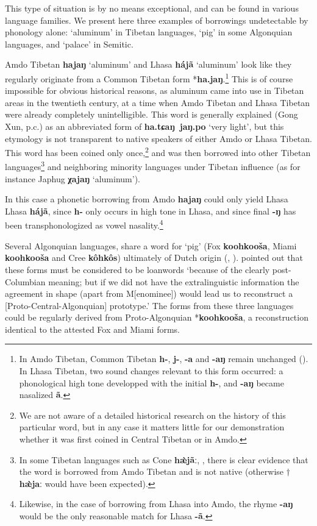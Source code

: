 \documentclass[oneside,a4paper,11pt]{article}
\newcommand{\ipa}[1]{\textbf{{\phon\mbox{#1}}}} %
\begin{document}
This type of situation is by no means exceptional, and can be found in various language families. We present here three examples of borrowings undetectable by phonology alone: `aluminum' in Tibetan languages, `pig' in some Algonquian languages, and `palace' in Semitic. 

Amdo Tibetan \ipa{hajaŋ} `aluminum' and Lhasa \ipa{hájã} `aluminum' look like they regularly originate from a Common Tibetan form *\ipa{ha.jaŋ}.\footnote{In Amdo Tibetan, Common Tibetan \ipa{h-}, \ipa{j-}, \ipa{-a} and \ipa{-aŋ} remain unchanged (\citealt{gong16amdo}). In Lhasa Tibetan, two sound changes relevant to this form occurred: a phonological high tone developped with the initial \ipa{h-}, and \ipa{-aŋ} became nasalized \ipa{ã}.} This is of course impossible for obvious historical reasons, as aluminum came into use in Tibetan areas in the twentieth century, at a time when Amdo Tibetan and Lhasa Tibetan were already completely unintelligible. This word is generally explained (Gong Xun, p.c.) as an abbreviated form of \ipa{ha.tɕaŋ jaŋ.po} `very light', but this etymology is not transparent to native speakers of either Amdo or Lhasa Tibetan. This word has been coined only once,\footnote{We are not aware of a detailed historical research on the history of this particular word, but in any case it matters little for our demonstration whether it was first coined in Central Tibetan or in Amdo.} and was then borrowed into other Tibetan languages\footnote{In some Tibetan languages such as Cone \ipa{hæ̀jãː}, \citet[306]{jacques14cone}, there is clear evidence that the word is borrowed from Amdo Tibetan and is not native (otherwise $\dagger$\ipa{hæ̀jaː} would have been expected). } and neighboring minority languages under Tibetan influence (as for instance Japhug \ipa{χajaŋ} `aluminum').

In this case a phonetic borrowing from Amdo \ipa{hajaŋ} could only yield Lhasa Lhasa \ipa{hájã}, since \ipa{h-} only occurs in high tone in Lhasa, and since final \ipa{-ŋ} has been transphonologized as vowel nasality.\footnote{Likewise, in the case of borrowing from Lhasa into Amdo, the rhyme \ipa{-aŋ} would be the only reasonable match for Lhasa \ipa{-ã}.} 

Several Algonquian languages, share a word for `pig' (Fox \ipa{koohkooša}, Miami \ipa{koohkooša} and Cree \ipa{kôhkôs}) ultimately of Dutch origin (\citealt{goddard74dutch}, \citealt{costa13borrowing}). \citet[266]{hockett57k} pointed out that these forms must be considered to be loanwords `because of the clearly post-Columbian meaning; but if we did not have the extralinguistic information the agreement in shape (apart from M[enominee]) would lead us to reconstruct a [Proto-Central-Algonquian] prototype.' The forms from these three languages could be regularly derived from Proto-Algonquian *\ipa{koohkooša}, a reconstruction identical to the attested Fox and Miami forms.
\end{document}
